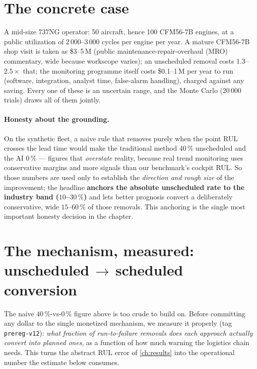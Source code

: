 \section{The concrete case}
\label{sec:econ-case}

A mid-size 737NG operator: 50 aircraft, hence 100 CFM56-7B engines, at a public utilization
of 2\,000--3\,000 cycles per engine per year. A mature CFM56-7B shop visit is taken as
\$3--5\,M (public maintenance-repair-overhaul (MRO) commentary, wide because workscope varies); an unscheduled removal
costs $1.3$--$2.5\times$ that; the monitoring programme itself costs \$0.1--1\,M per year to
run (software, integration, analyst time, false-alarm handling), charged against any saving.
Every one of these is an uncertain range, and the Monte Carlo (20\,000 trials) draws all of
them jointly.

\paragraph{Honesty about the grounding.} On the synthetic fleet, a naive rule that removes
purely when the point RUL crosses the lead time would make the traditional method
$40\,\%$ unscheduled and the AI $0\,\%$ --- figures that \emph{overstate} reality, because
real trend monitoring uses conservative margins and more signals than our benchmark's
cockpit RUL. So those numbers are used only to establish the \emph{direction and rough size}
of the improvement; the headline \textbf{anchors the absolute unscheduled rate to the
industry band ($10$--$30\,\%$)} and lets better prognosis convert a deliberately
conservative, wide $15$--$60\,\%$ of those removals. This anchoring is the single most
important honesty decision in the chapter.

\section{The mechanism, measured: unscheduled$\,\to\,$scheduled conversion}
\label{sec:ops-conversion}

The naive $40\,\%$-vs-$0\,\%$ figure above is too crude to build on. Before committing any
dollar to the single monetized mechanism, we measure it properly (tag \texttt{prereg-v12}):
\emph{what fraction of run-to-failure removals does each approach actually convert into planned
ones}, as a function of how much warning the logistics chain needs. This turns the abstract RUL
error of \cref{ch:results} into the operational number the estimate below consumes.

